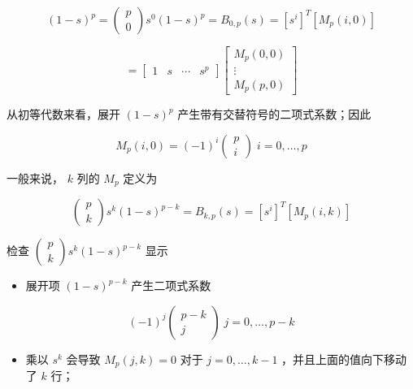 \documentclass[../main.tex]{subfiles}
\begin{document}
\[
{\left( 1 - s\right) }^{p} = \left( \begin{array}{l} p \\  0 \end{array}\right) {s}^{0}{\left( 1 - s\right) }^{p} = {B}_{0,p}\left( s\right)  = {\left\lbrack  {s}^{i}\right\rbrack  }^{T}\left\lbrack  {{M}_{p}\left( {i,0}\right) }\right\rbrack
\]

\[
= \left\lbrack  \begin{array}{llll} 1 & s & \cdots & {s}^{p} \end{array}\right\rbrack  \left\lbrack  \begin{matrix} {M}_{p}\left( {0,0}\right) \\  \vdots \\  {M}_{p}\left( {p,0}\right)  \end{matrix}\right\rbrack
\]

从初等代数来看，展开 \({\left( 1 - s\right) }^{p}\) 产生带有交替符号的二项式系数；因此

\[
{M}_{p}\left( {i,0}\right)  = {\left( -1\right) }^{i}\left( \begin{matrix} p \\  i \end{matrix}\right) \;i = 0,\ldots ,p \tag{6.81}
\]

一般来说， \(k\) 列的 \({M}_{p}\) 定义为

\[
\left( \begin{array}{l} p \\  k \end{array}\right) {s}^{k}{\left( 1 - s\right) }^{p - k} = {B}_{k,p}\left( s\right)  = {\left\lbrack  {s}^{i}\right\rbrack  }^{T}\left\lbrack  {{M}_{p}\left( {i,k}\right) }\right\rbrack
\]

检查 \(\left( \begin{array}{l} p \\  k \end{array}\right) {s}^{k}{\left( 1 - s\right) }^{p - k}\) 显示

\begin{itemize}
\item 展开项 \({\left( 1 - s\right) }^{p - k}\) 产生二项式系数
\end{itemize}

\[
{\left( -1\right) }^{j}\left( \begin{matrix} p - k \\  j \end{matrix}\right) \;j = 0,\ldots ,p - k
\]

\begin{itemize}
\item 乘以 \({s}^{k}\) 会导致 \({M}_{p}\left( {j,k}\right)  = 0\) 对于 \(j = 0,\ldots ,k - 1\) ，并且上面的值向下移动了 \(k\) 行；
\end{itemize}
\end{document}

